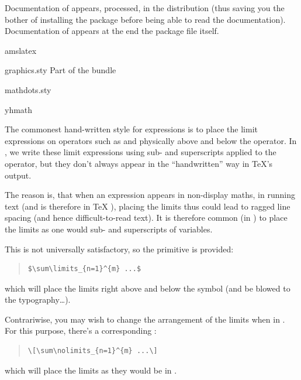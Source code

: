 Documentation of  appears, processed, in the
distribution (thus saving you the bother of installing the package
before being able to read the documentation).  Documentation of
 appears at the end the package file itself.
\begin{ctanrefs}
\item[amslatex]
\item[graphics.sty]Part of the  bundle
\item[mathdots.sty]
\item[yhmath]
\end{ctanrefs}


The commonest hand-written style for expressions is to place the limit
expressions on operators such as  and  physically
above and below the operator.  In \AllTeX{}, we write these limit
expressions using sub- and superscripts applied to the operator, but
they don't always appear in the ``handwritten'' way in \TeX{}'s
output.

The reason is, that when an expression appears in non-display maths,
in running text (and is therefore in \TeX{} ), placing
the limits thus could lead to ragged line spacing (and hence
difficult-to-read text).  It is therefore common (in )
to place the limits as one would sub- and superscripts of variables.

This is not universally satisfactory, so the primitive  is
provided:
\begin{quote}
\begin{verbatim}
$\sum\limits_{n=1}^{m} ...$
\end{verbatim}
\end{quote}
which will place the limits right above and below the symbol (and be
blowed to the typography\dots{}).

Contrariwise, you may wish to change the arrangement of the limits
when in .  For this purpose, there's a corresponding
:
\begin{quote}
\begin{verbatim}
\[\sum\nolimits_{n=1}^{m} ...\]
\end{verbatim}
\end{quote}
which will place the limits as they would be in .

